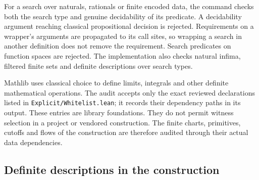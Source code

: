 For a search over naturals, rationals or finite encoded data, the command checks
both the search type and genuine decidability of its predicate. A decidability
argument reaching classical propositional decision is rejected. Requirements
on a wrapper's arguments are propagated to its call sites, so wrapping a search
in another definition does not remove the requirement. Search predicates on
function spaces are rejected. The implementation also checks natural infima,
filtered finite sets and definite descriptions over search types.

Mathlib uses classical choice to define limits, integrals and other definite
mathematical operations. The audit accepts only the exact reviewed declarations
listed in \texttt{Explicit/}\allowbreak\texttt{Whitelist.lean}; it records their dependency paths
in its output. These entries are library foundations. They do not permit witness
selection in a project or vendored construction. The finite charts, primitives,
cutoffs and flows of the construction are therefore audited through their actual
data dependencies.

\begingroup\sloppy
\subsection{Definite descriptions in the construction}\label{sec:xpl-descriptions}

